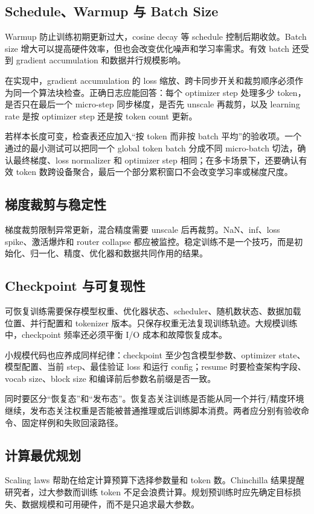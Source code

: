 \documentclass[UTF8,zihao=-4,openany]{ctexbook}
\begin{document}
\subsection{Schedule、Warmup 与 Batch Size}
Warmup 防止训练初期更新过大，cosine decay 等 schedule 控制后期收敛。Batch size 增大可以提高硬件效率，但也会改变优化噪声和学习率需求。有效 batch 还受到 gradient accumulation 和数据并行规模影响。

在实现中，gradient accumulation 的 loss 缩放、跨卡同步开关和裁剪顺序必须作为同一个算法块检查。正确日志应能回答：每个 optimizer step 处理多少 token，是否只在最后一个 micro-step 同步梯度，是否先 unscale 再裁剪，以及 learning rate 是按 optimizer step 还是按 token count 更新。

若样本长度可变，检查表还应加入“按 token 而非按 batch 平均”的验收项。一个通过的最小测试可以把同一个 global token batch 分成不同 micro-batch 切法，确认最终梯度、loss normalizer 和 optimizer step 相同；在多卡场景下，还要确认有效 token 数跨设备聚合，最后一个部分累积窗口不会改变学习率或梯度尺度。

\subsection{梯度裁剪与稳定性}
梯度裁剪限制异常更新，混合精度需要 unscale 后再裁剪。NaN、inf、loss spike、激活爆炸和 router collapse 都应被监控。稳定训练不是一个技巧，而是初始化、归一化、精度、优化器和数据共同作用的结果。

\subsection{Checkpoint 与可复现性}
可恢复训练需要保存模型权重、优化器状态、scheduler、随机数状态、数据加载位置、并行配置和 tokenizer 版本。只保存权重无法复现训练轨迹。大规模训练中，checkpoint 频率还必须平衡 I/O 成本和故障恢复成本。

小规模代码也应养成同样纪律：checkpoint 至少包含模型参数、optimizer state、模型配置、当前 step、最佳验证 loss 和运行 config；resume 时要检查架构字段、vocab size、block size 和编译前后参数名前缀是否一致。

同时要区分“恢复态”和“发布态”。恢复态关注训练是否能从同一个并行/精度环境继续，发布态关注权重是否能被普通推理或后训练脚本消费。两者应分别有验收命令、固定样例和失败回滚路径。

\subsection{计算最优规划}
Scaling laws 帮助在给定计算预算下选择参数量和 token 数。Chinchilla 结果提醒研究者，过大参数而训练 token 不足会浪费计算。规划预训练时应先确定目标损失、数据规模和可用硬件，而不是只追求最大参数。
\end{document}
